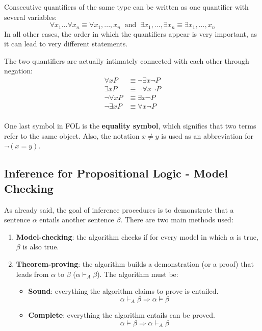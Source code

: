\documentclass{article}
\begin{document}
Consecutive quantifiers of the same type can be written as one quantifier with several variables:
\[\forall x_1 ... \forall x_n \equiv \forall x_1,...,x_n \;\;\text{and}\;\; \exists x_1, ..., \exists x_n \equiv \exists x_1,...,x_n\]
In all other cases, the order in which the quantifiers appear is very important, as it can lead to very different statements.

The two quantifiers are actually intimately connected with each other through negation:
\begin{align*}
    \forall x P & \equiv \neg\exists x \neg P \\
    \exists x P & \equiv \neg\forall x \neg P \\
    \neg\forall x P & \equiv \exists x \neg P \\
    \neg\exists x P & \equiv \forall x \neg P \\
\end{align*}

One last symbol in FOL is the \textbf{equality symbol}, which signifies that two terms refer to the same object. Also, the notation \(x\neq y\) is used as an abbreviation for \(\neg(x=y)\).

\subsection{Inference for Propositional Logic - Model Checking}
As already said, the goal of inference procedures is to demonstrate that a sentence \(\alpha\) entails another sentence \(\beta\). There are two main methods used:
\begin{enumerate}
    \item \textbf{Model-checking}: the algorithm checks if for every model in which \(\alpha\) is true, \(\beta\) is also true.
    \item \textbf{Theorem-proving}: the algorithm builds a demonstration (or a proof) that leads from \(\alpha\) to \(\beta\) (\(\alpha \vdash_A \beta\)). The algorithm must be:
    \begin{itemize}
        \item \textbf{Sound}: everything the algorithm claims to prove is entailed.
            \[\alpha \vdash_A\beta\Rightarrow\alpha\models\beta\]
        \item \textbf{Complete}: everything the algorithm entails can be proved. 
            \[\alpha\models\beta\Rightarrow\alpha\vdash_A\beta\]
    \end{itemize}        
\end{enumerate}
\end{document}
